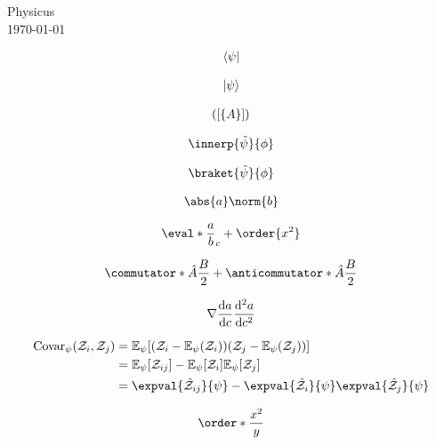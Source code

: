 \documentclass[11pt]{article}
\begin{document}
\begin{center}
  {\Large Physicus} \\ \vspace{5mm}
  \today
\end{center}

\begin{align*}
  \langle\psi\rvert
\end{align*}

\begin{align*}
  \lvert\psi\rangle
\end{align*}

\begin{align*}
  \lparen\lbrack\lbrace A\rbrace\rbrack\rparen
\end{align*}

\begin{align*}
  \innerp{\tilde{\psi}}{\phi}
\end{align*}

\begin{align*}
  \braket{\tilde{\psi}}{\phi}
\end{align*}

\begin{align*}
  \abs{a}\norm{b}
\end{align*}

\begin{align*}
  \eval*{\frac{a}{b}}_c + \order{x^2}
\end{align*}

\begin{align*}
  \commutator*{\hat{A}}{\frac{B}{2}} + \anticommutator*{\hat{A}}{\frac{B}{2}}
\end{align*}

\begin{align*}
  \grad\dv{a}{c}\dv[2]{a}{c}
\end{align*}

\begin{align*}
  \text{Covar}_\psi\pqty{\mathcal{Z}_i,\mathcal{Z}_j}
  & = \mathbb{E}_\psi\bqty{ \pqty{\mathcal{Z}_i - \mathbb{E}_\psi\pqty{ \mathcal{Z}_i}} \pqty{\mathcal{Z}_j - \mathbb{E}_\psi\pqty{ \mathcal{Z}_j}} } \\
  & = \mathbb{E}_\psi\bqty*{\mathcal{Z}_{ij}} - \mathbb{E}_\psi\bqty*{\mathcal{Z}_i}\mathbb{E}_\psi\bqty*{\mathcal{Z}_j}                              \\
  & = \expval{\hat{\mathcal{Z}}_{ij}}{\psi} - \expval{\hat{\mathcal{Z}}_{i}}{\psi}\expval{\hat{\mathcal{Z}}_{j}}{\psi}
\end{align*}

\begin{align*}
  \order*{\frac{x^2}{y}}
\end{align*}
\end{document}
